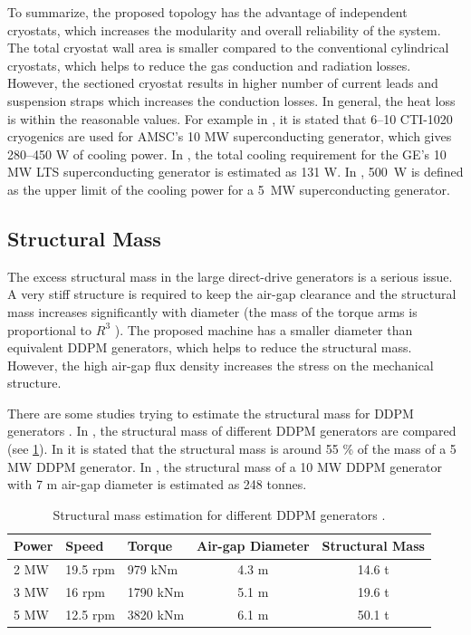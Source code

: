 \documentclass[12pt]{iopart}
\begin{document}
To summarize, the proposed topology has the advantage of independent cryostats, which increases the modularity and overall reliability of the system. The total cryostat wall area is smaller compared to the conventional cylindrical cryostats, which helps to reduce the gas conduction and radiation losses. However, the sectioned cryostat results in higher number of current leads and suspension straps which increases the conduction losses. In general, the heat loss is within the reasonable values. For example in \cite{Snitchler2011}, it is stated that 6--10 CTI-1020 cryogenics are used for AMSC's 10 MW superconducting generator, which gives 280--450 W of cooling power.
In \cite{Stautner2012}, the total cooling requirement for the GE's 10 MW LTS superconducting generator is estimated as 131 W. In \cite{Abrahamsen2012}, 500~W is defined as the upper limit of the cooling power for a 5~MW superconducting generator.


\subsection{Structural Mass}
The excess structural mass in the large direct-drive generators is a serious issue. A very stiff structure is required to keep the air-gap clearance and the structural mass increases significantly with diameter (the mass of the torque arms is proportional to $R^3$ \cite{McDonald2008b}). The proposed machine has a smaller diameter than equivalent DDPM generators, which helps to reduce the structural mass. However, the high air-gap flux density increases the stress on the mechanical structure.

There are some studies trying to estimate the structural mass for DDPM generators \cite{McDonald2008b, Zavvos2012}. In \cite{Bang2010}, the structural mass of different DDPM generators are compared (see \ref{DDPM_structural_mass}). In \cite{Bang2010a} it is stated that the structural mass is around 55 \% of the mass of a 5 MW DDPM generator. In \cite{Zavvos2012}, the structural mass of a 10 MW DDPM generator with 7 m air-gap diameter is estimated as 248 tonnes. 

\begin{table}[t]
  \centering
  \begin{tabular}{lllcc}
 Power & Speed & Torque & Air-gap Diameter & Structural Mass\\ 
 \hline
2 MW & 19.5 rpm & 979 kNm & 4.3 m & 14.6 t \\
3 MW & 16 rpm & 1790 kNm & 5.1 m & 19.6 t \\
5 MW & 12.5 rpm & 3820 kNm & 6.1 m & 50.1 t \\
\hline
 \end{tabular}
  \caption{Structural mass estimation for different DDPM generators \cite{Bang2010}.}
  \label{DDPM_structural_mass}
\end{table}
\end{document}
